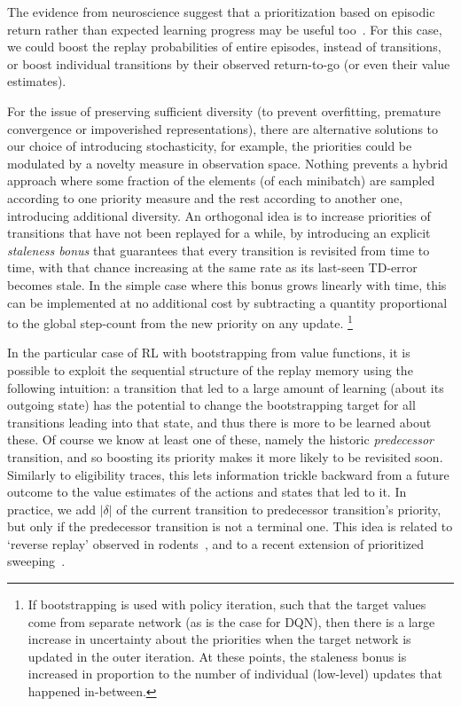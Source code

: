 \documentclass[a4paper]{article}
\begin{document}
The evidence from neuroscience suggest that a prioritization based on episodic return rather than expected learning progress may be useful too~\cite{dharsh1,dharsh2,dharsh3}. For this case, we could boost the replay probabilities of entire episodes, instead of transitions, or boost individual transitions by their observed return-to-go (or even their value estimates).


For the issue of preserving sufficient diversity (to prevent overfitting, premature convergence or impoverished representations), 
there are alternative solutions 
to our choice of introducing stochasticity, for example, the priorities could be modulated
by a novelty measure in observation space. 
Nothing prevents a hybrid approach where some fraction of the elements (of each minibatch) are sampled according to one priority measure and the rest according to another one, introducing additional diversity.
An orthogonal idea is to increase priorities of transitions that have not been 
replayed for a while, by introducing an explicit \emph{staleness bonus} that guarantees that every transition 
is revisited from time to time, with that chance increasing at the same rate as its last-seen
TD-error becomes stale.
In the simple case where this bonus grows linearly with time, 
this can be implemented at no additional cost by subtracting a quantity proportional to the global step-count from the new priority on any update.%
\footnote{
If bootstrapping is used with policy iteration, such that the target values come from separate network (as is the case for DQN), 
then there is a large increase in uncertainty about the priorities when the target network is updated in the outer iteration.
At these points, the staleness bonus is increased in proportion to the number of individual (low-level) updates
that happened in-between.
}



In the particular case of RL with bootstrapping from value functions, it is possible to exploit the sequential structure 
of the replay memory using the following intuition:
a transition that led to a large amount of learning (about its outgoing state) 
has the potential to change the bootstrapping target for all transitions leading into that state, and
thus there is more to be learned about these. 
Of course we know at least one of these, namely the historic \emph{predecessor} transition,
and so boosting its priority makes it more likely to be revisited soon.
Similarly to eligibility traces, this lets information trickle backward from a future outcome to
the value estimates of the actions and states that led to it.
In practice, we add $|\delta|$ of the current transition to predecessor transition's priority, but only if the predecessor transition
is not a terminal one. This idea is related to `reverse replay' observed in rodents~\cite{dharsh3}, and to a recent extension of prioritized sweeping~\citep{harm}.
\end{document}
